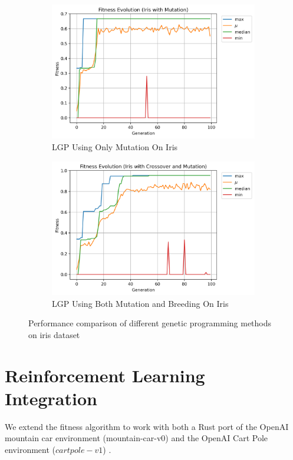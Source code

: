\documentclass[12pt, final]{dalcsthesis}
\begin{document}
\begin{figure}
	\begin{subfigure}[b]{0.48\textwidth}
		\includegraphics[width=\textwidth]{iris_mutation.png}
		\caption{LGP Using Only Mutation On Iris}
		\label{fig:iris_mutation}
	\end{subfigure}
	\hfill
	\begin{subfigure}[b]{0.48\textwidth}
		\includegraphics[width=\textwidth]{iris_full.png}
		\caption{LGP Using Both Mutation and Breeding On Iris}
		\label{fig:iris_full}
	\end{subfigure}

	\caption{Performance comparison of different genetic programming methods on iris dataset}
	\label{fig:iris_comparison}
\end{figure}

\section{Reinforcement Learning Integration}
We extend the fitness algorithm to work with both a Rust port of the OpenAI mountain car environment (mountain-car-v0) \cite{1606.01540} and the OpenAI Cart Pole environment ($cartpole-v1$) \cite{1606.01540}.
\end{document}
